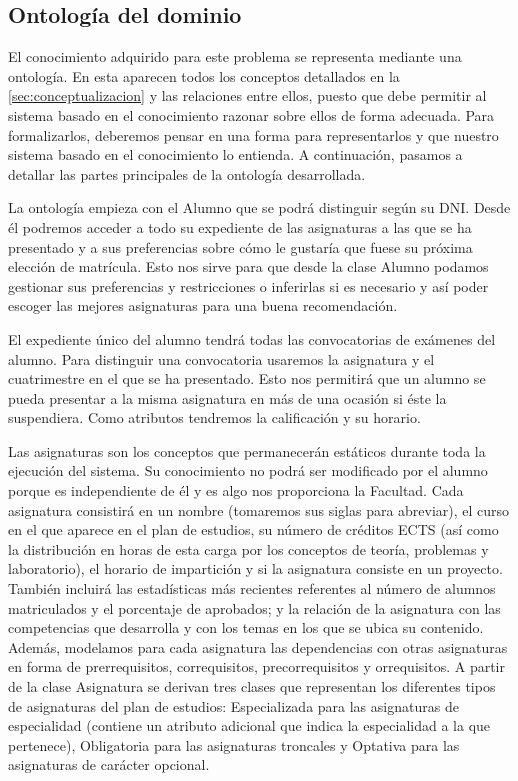 
\subsection{Ontología del dominio} \label{sec:ontologia}

El conocimiento adquirido para este problema se representa mediante una
ontología. En esta aparecen todos los conceptos detallados en la
\autoref{sec:conceptualizacion} y las relaciones entre ellos, puesto que debe
permitir al sistema basado en el conocimiento razonar sobre ellos de forma
adecuada. Para formalizarlos, deberemos pensar en una forma para representarlos
y que nuestro sistema basado en el conocimiento lo entienda. A continuación, 
pasamos a detallar las partes principales de la ontología desarrollada.

La ontología empieza con el Alumno que se podrá distinguir según su DNI.
Desde él podremos acceder a todo su expediente de las asignaturas a las
que se ha presentado y a sus preferencias sobre cómo le gustaría que fuese su
próxima elección de matrícula. Esto nos sirve para que desde la clase Alumno
podamos gestionar sus preferencias y restricciones o inferirlas si es
necesario y así poder escoger las mejores asignaturas para una buena recomendación.

El expediente único del alumno tendrá todas las convocatorias de exámenes
del alumno. Para distinguir una convocatoria usaremos la asignatura y el
cuatrimestre en el que se ha presentado. Esto nos permitirá que un alumno
se pueda presentar a la misma asignatura en más de una ocasión si éste la
suspendiera. Como atributos tendremos la calificación y su horario.

Las asignaturas son los conceptos que permanecerán estáticos durante toda
la ejecución del sistema. Su conocimiento no podrá ser modificado por el
alumno porque es independiente de él y es algo nos proporciona la Facultad.
Cada asignatura consistirá en un nombre (tomaremos sus siglas para abreviar),
el curso en el que aparece en el plan de estudios, su número de créditos
ECTS (así como la distribución en horas de esta carga por los conceptos de
teoría, problemas y laboratorio), el horario de impartición y si la asignatura
consiste en un proyecto. También incluirá las estadísticas más recientes
referentes al número de alumnos matriculados y el porcentaje de aprobados; y la
relación de la asignatura con las competencias que desarrolla y con los temas
en los que se ubica su contenido. Además, modelamos para cada asignatura las
dependencias con otras asignaturas en forma de prerrequisitos, correquisitos,
precorrequisitos y orrequisitos.
A partir de la clase Asignatura se derivan tres clases que representan los
diferentes tipos de asignaturas del plan de estudios: Especializada para
las asignaturas de especialidad (contiene un atributo adicional que indica
la especialidad a la que pertenece), Obligatoria para las asignaturas troncales
y Optativa para las asignaturas de carácter opcional.

